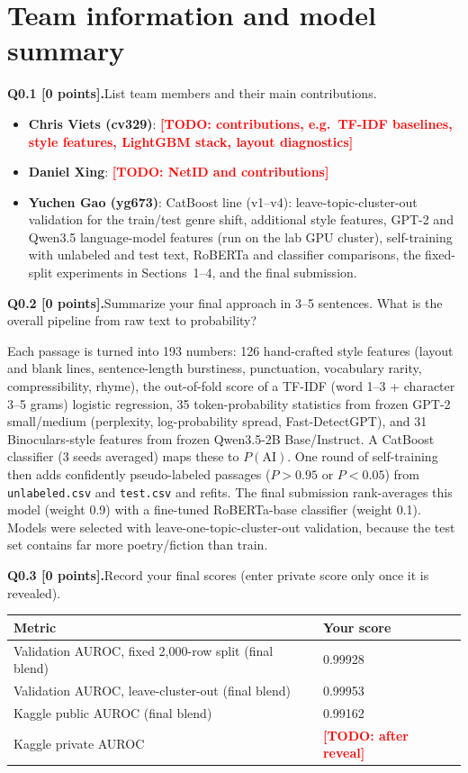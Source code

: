 \documentclass[11pt,letterpaper]{article}
\newcommand{\todo}[1]{\textcolor{red}{\textbf{[TODO: #1]}}}
\newcommand{\question}[2]{\needspace{4\baselineskip}\par\addvspace{0.45em}\noindent\textbf{#1}\quad #2\par\nobreak\vspace{0.1em}}
\begin{document}
\section{Team information and model summary}
\question{Q0.1 [0 points].}{List team members and their main contributions.}
\begin{itemize}
\item \textbf{Chris Viets (cv329)}: \todo{contributions, e.g.\ TF-IDF baselines, style features, LightGBM stack, layout diagnostics}
\item \textbf{Daniel Xing}: \todo{NetID and contributions}
\item \textbf{Yuchen Gao (yg673)}: CatBoost line (v1--v4): leave-topic-cluster-out validation for the train/test genre shift, additional style features, GPT-2 and Qwen3.5 language-model features (run on the lab GPU cluster), self-training with unlabeled and test text, RoBERTa and classifier comparisons, the fixed-split experiments in Sections~1--4, and the final submission.
\end{itemize}
\question{Q0.2 [0 points].}{Summarize your final approach in 3--5 sentences. What is the overall pipeline from raw text to probability?}
Each passage is turned into 193 numbers: 126 hand-crafted style features (layout and blank lines, sentence-length burstiness, punctuation, vocabulary rarity, compressibility, rhyme), the out-of-fold score of a TF-IDF (word 1--3 + character 3--5 grams) logistic regression, 35 token-probability statistics from frozen GPT-2 small/medium (perplexity, log-probability spread, Fast-DetectGPT), and 31 Binoculars-style features from frozen Qwen3.5-2B Base/Instruct. A CatBoost classifier (3 seeds averaged) maps these to $P(\text{AI})$. One round of self-training then adds confidently pseudo-labeled passages ($P>0.95$ or $P<0.05$) from \texttt{unlabeled.csv} and \texttt{test.csv} and refits. The final submission rank-averages this model (weight 0.9) with a fine-tuned RoBERTa-base classifier (weight 0.1). Models were selected with leave-one-topic-cluster-out validation, because the test set contains far more poetry/fiction than train.
\question{Q0.3 [0 points].}{Record your final scores (enter private score only once it is revealed).}
\begin{tabularx}{\linewidth}{@{}Yp{1.8in}@{}}\toprule Metric & Your score \\ \midrule Validation AUROC, fixed 2,000-row split (final blend) & 0.99928 \\ Validation AUROC, leave-cluster-out (final blend) & 0.99953 \\ Kaggle public AUROC (final blend) & 0.99162 \\ Kaggle private AUROC & \todo{after reveal} \\ \bottomrule\end{tabularx}
\end{document}
